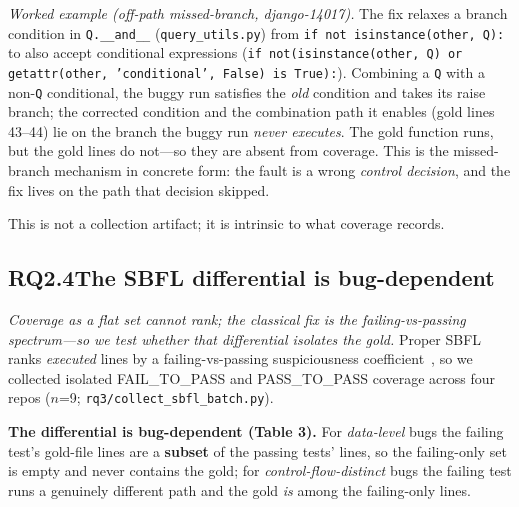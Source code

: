 \documentclass[11pt]{article}
\newcommand{\code}[1]{\texttt{#1}}
\begin{document}
\emph{Worked example (off-path missed-branch, django-14017).} The fix relaxes a branch condition in \code{Q.\_\_and\_\_} (\code{query\_utils.py}) from \code{if not isinstance(other, Q):} to also accept conditional expressions (\code{if not(isinstance(other, Q) or getattr(other, 'conditional', False) is True):}). Combining a \code{Q} with a non-\code{Q} conditional, the buggy run satisfies the \emph{old} condition and takes its raise branch; the corrected condition and the combination path it enables (gold lines 43--44) lie on the branch the buggy run \emph{never executes}. The gold function runs, but the gold lines do not---so they are absent from coverage. This is the missed-branch mechanism in concrete form: the fault is a wrong \emph{control decision}, and the fix lives on the path that decision skipped.

This is not a collection artifact; it is intrinsic to what coverage records.

\subsection*{RQ2.4\quad The SBFL differential is bug-dependent}
\emph{Coverage as a flat set cannot rank; the classical fix is the failing-vs-passing spectrum---so we test whether that differential isolates the gold.} Proper SBFL ranks \emph{executed} lines by a failing-vs-passing suspiciousness coefficient~\citep{ochiai}, so we collected isolated FAIL\_TO\_PASS and PASS\_TO\_PASS coverage across four repos ($n$=9; \code{rq3/collect\_sbfl\_batch.py}).

\smallskip\noindent\textbf{The differential is bug-dependent (Table 3).} For \emph{data-level} bugs the failing test's gold-file lines are a \textbf{subset} of the passing tests' lines, so the failing-only set is empty and never contains the gold; for \emph{control-flow-distinct} bugs the failing test runs a genuinely different path and the gold \emph{is} among the failing-only lines.
\end{document}
